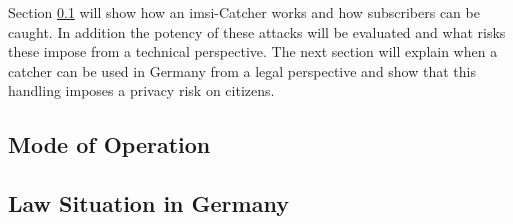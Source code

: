 Section \ref{sec:catcher_operation} will show how an \gls{imsi}-Catcher works and how subscribers can be caught.
In addition the potency of these attacks will be evaluated and what risks these impose from a technical perspective.
The next section will explain when a catcher can be used in Germany from a legal perspective and show that this handling imposes a privacy risk on citizens.

\subsection{Mode of Operation}
\label{sec:catcher_operation}


\subsection{Law Situation in Germany}
\label{sec:catcher_law}








